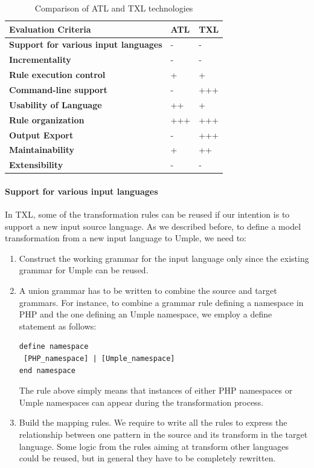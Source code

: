 \begin{table}[h]
\centering
\caption{Comparison of ATL and TXL technologies}
\label{table:comparisonATLTXL}
\begin{tabular}{l|p{2cm}|p{2cm}}
\toprule
\rowcolor[HTML]{BBDAFF}
\textbf{Evaluation Criteria} & \textbf{ATL}  & \textbf{TXL}   \\ \midrule
\textbf{Support for various input languages} & - &  -  \\ \hline
\textbf{Incrementality} & - &  -  \\ \hline
\textbf{Rule execution control} & + &   + \\ \hline
\textbf{Command-line support} & - & +++	    \\ \hline
\textbf{Usability of Language} & ++  & +   \\ \hline
\textbf{Rule organization} & +++ &  +++  \\ \hline
\textbf{Output Export} & - &  +++  \\ \hline
\textbf{Maintainability} & + &  ++  \\ \hline
\textbf{Extensibility} & - &  -  \\ 
\bottomrule
\end{tabular}
\end{table}

\paragraph*{Support for various input languages}

In TXL, some of the transformation rules can be reused if our intention is to support a new input source language.  As we described before, to define a model transformation from a new  input language to Umple, we need to:

\begin{enumerate}
\item Construct the working grammar for the input language only since the existing grammar for Umple can be reused. 
\item A union grammar has to be written to combine the source and target grammars. For instance, to combine a grammar rule defining a namespace in PHP and the one defining an Umple namespace, we employ a define statement as follows:

\begin{lstlisting}[style=umplePlain] 
define namespace
 [PHP_namespace] | [Umple_namespace]
end namespace
\end{lstlisting}
The rule above simply means that instances of either PHP namespaces or Umple namespaces can appear during the transformation process. 
\item Build the mapping rules. We require to write all the rules to express the relationship between one pattern in the source  and its transform in the target language. Some logic from the rules aiming at transform other languages could be reused, but in general they have to be completely rewritten. 
\end{enumerate}


